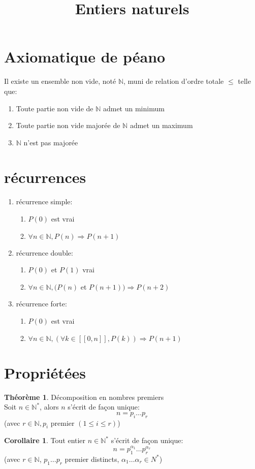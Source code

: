 \documentclass[fleqn]{article}
\title{Entiers naturels}
\date{}
\theoremstyle{definition} \newtheorem*{defi}{D\'efinition}
\theoremstyle{definition} \newtheorem*{theo}{Th\'eor\`eme}
\theoremstyle{definition} \newtheorem*{coro}{Corollaire}
\theoremstyle{remark} \newtheorem*{rqs}{Remarques}
\theoremstyle{definition} \newtheorem*{prop}{Propri\'et\'e}
\begin{document}
\maketitle

\section{Axiomatique de p\'eano}
Il existe un ensemble non vide, not\'e $\mathbb{N}$, muni de relation d'ordre totale $\leq$ telle que:
\begin{enumerate}
	\item Toute partie non vide de $\mathbb{N}$ admet un minimum
	\item Toute partie non vide major\'ee de $\mathbb{N}$ admet un maximum
	\item $\mathbb{N}$ n'est pas major\'ee
\end{enumerate}

\section{r\'ecurrences}
\begin{enumerate}
	\item r\'ecurrence simple:
		\begin{enumerate}
			\item $P(0)$ est vrai
			\item $\forall n \in \mathbb{N}, P(n) \Rightarrow P(n+1)$
		\end{enumerate}
	\item r\'ecurrence double:
		\begin{enumerate}
			\item $P(0)$ et $P(1)$ vrai
			\item $\forall n \in \mathbb{N}, (P(n)$ et $P(n+1)) \Rightarrow P(n+2)$
		\end{enumerate}
	\item r\'ecurrence forte:
		\begin{enumerate}
			\item $P(0)$ est vrai
			\item $\forall n \in \mathbb{N}, (\forall k \in [\![0,n]\!], P(k)) \Rightarrow P(n+1)$
		\end{enumerate}
\end{enumerate}

\section{Propri\'et\'ees}
\begin{theo} D\'ecomposition en nombres premiers \\
		Soit $n \in \mathbb{N}^*$, alors $n$ s'\'ecrit de fa\c{c}on unique:
		\[n = p_i \ldots p_r\] (avec $r \in \mathbb{N}, p_i$ premier $(1 \leq i \leq r)$)
\end{theo}
\begin{coro}
	Tout entier $n \in \mathbb{N}^*$ s'\'ecrit de fa\c{c}on unique:
	\[n = p_1^{\alpha_1} \ldots p_r^{\alpha_r}\] (avec $r \in \mathbb{N}$,
	$p_1 \ldots p_r$ premier distincts, $\alpha_1 \ldots \alpha_r \in {N}^*$)
\end{coro}
\end{document}
